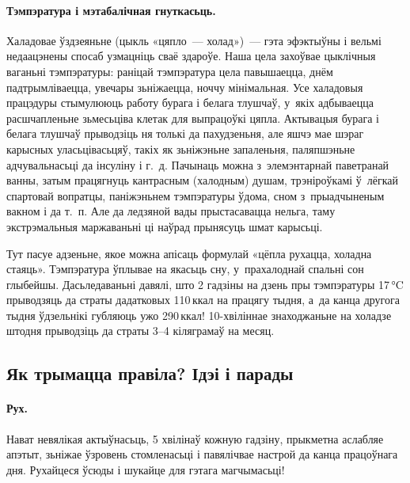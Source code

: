 
\paragraph{Тэмпэратура і мэтабалічная гнуткасьць.}
Халадовае ўздзеяньне (цыкль «цяпло~--- холад»)~--- гэта эфэктыўны і вельмі недаацэнены спосаб узмацніць сваё здароўе. Наша цела захоўвае цыклічныя ваганьні тэмпэратуры: раніцай тэмпэратура цела павышаецца, днём падтрымліваецца, увечары зьніжаецца, ноччу мінімальная. Усе халадовыя працэдуры стымулююць работу бурага і белага тлушчаў, у~якіх адбываецца расшчапленьне зьмесьціва клетак для выпрацоўкі цяпла. Актывацыя бурага і белага тлушчаў прыводзіць ня толькі да пахудзеньня, але яшчэ мае шэраг карысных уласьцівасьцяў, такіх як зьніжэньне запаленьня, паляпшэньне адчувальнасьці да інсуліну і г.~д. Пачынаць можна з~элемэнтарнай паветранай ванны, затым працягнуць кантрасным (халодным) душам, трэніроўкамі ў~лёгкай спартовай вопратцы, паніжэньнем тэмпэратуры ўдома, сном з~прыадчыненым вакном і да т.~п. Але да ледзяной вады прыстасавацца нельга, таму экстрэмальныя маржаваньні ці наўрад прынясуць шмат карысьці.

Тут пасуе адзеньне, якое можна апісаць формулай «цёпла рухацца, холадна стаяць». Тэмпэратура ўплывае на якасьць сну, у~прахалоднай спальні сон глыбейшы. Дасьледаваньні давялі, што 2 гадзіны на дзень пры тэмпэратуры 17\,°C прыводзяць да страты дадатковых 110\,ккал на працягу тыдня, а~да канца другога тыдня ўдзельнікі губляюць ужо 290\,ккал! 10-хвіліннае знаходжаньне на холадзе штодня прыводзіць да страты 3--4 кіляграмаў на месяц.

\subsection{Як трымацца правіла? Ідэі і парады}

\paragraph{Рух.}
Нават невялікая актыўнасьць, 5 хвілінаў кожную гадзіну, прыкметна аслабляе апэтыт, зьніжае ўзровень стомленасьці і павялічвае настрой да канца працоўнага дня. Рухайцеся ўсюды і шукайце для гэтага магчымасьці!

